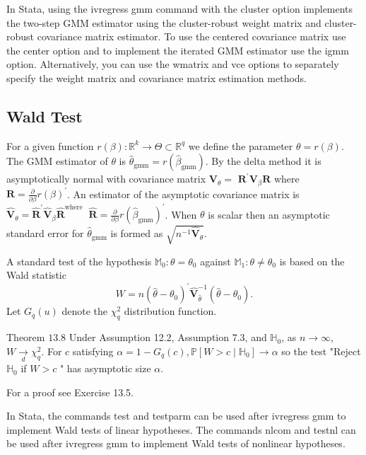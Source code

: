 \documentclass[10pt]{article}
\begin{document}
In Stata, using the ivregress gmm command with the cluster option implements the two-step GMM estimator using the cluster-robust weight matrix and cluster-robust covariance matrix estimator. To use the centered covariance matrix use the center option and to implement the iterated GMM estimator use the igmm option. Alternatively, you can use the wmatrix and vce options to separately specify the weight matrix and covariance matrix estimation methods.

\subsection{Wald Test}
For a given function $r(\beta): \mathbb{R}^{k} \rightarrow \Theta \subset \mathbb{R}^{q}$ we define the parameter $\theta=r(\beta)$. The GMM estimator of $\theta$ is $\widehat{\theta}_{\mathrm{gmm}}=r\left(\widehat{\beta}_{\mathrm{gmm}}\right)$. By the delta method it is asymptotically normal with covariance matrix $\boldsymbol{V}_{\theta}=$ $\boldsymbol{R}^{\prime} \boldsymbol{V}_{\beta} \boldsymbol{R}$ where $\boldsymbol{R}=\frac{\partial}{\partial \beta} r(\beta)^{\prime}$. An estimator of the asymptotic covariance matrix is $\widehat{\boldsymbol{V}}_{\theta}=\widehat{\boldsymbol{R}}^{\prime} \widehat{\boldsymbol{V}}_{\beta} \widehat{\boldsymbol{R}}^{\text {where }}$ $\widehat{\boldsymbol{R}}=\frac{\partial}{\partial \beta} r\left(\widehat{\beta}_{\mathrm{gmm}}\right)^{\prime}$. When $\theta$ is scalar then an asymptotic standard error for $\widehat{\theta}_{\mathrm{gmm}}$ is formed as $\sqrt{n^{-1} \widehat{\boldsymbol{V}}_{\theta}} .$

A standard test of the hypothesis $\mathbb{M}_{0}: \theta=\theta_{0}$ against $\mathbb{M}_{1}: \theta \neq \theta_{0}$ is based on the Wald statistic
$$
W=n\left(\widehat{\theta}-\theta_{0}\right)^{\prime} \widehat{\boldsymbol{V}}_{\widehat{\theta}}^{-1}\left(\widehat{\theta}-\theta_{0}\right) .
$$
Let $G_{q}(u)$ denote the $\chi_{q}^{2}$ distribution function.

Theorem $13.8$ Under Assumption 12.2, Assumption 7.3, and $\mathbb{H}_{0}$, as $n \rightarrow \infty$, $W \underset{d}{\longrightarrow} \chi_{q}^{2}$. For $c$ satisfying $\alpha=1-G_{q}(c), \mathbb{P}\left[W>c \mid \mathbb{H}_{0}\right] \longrightarrow \alpha$ so the test "Reject $\mathbb{H}_{0}$ if $W>c$ " has asymptotic size $\alpha$.

For a proof see Exercise 13.5.

In Stata, the commands test and testparm can be used after ivregress gmm to implement Wald tests of linear hypotheses. The commands nlcom and testnl can be used after ivregress gmm to implement Wald tests of nonlinear hypotheses.
\end{document}
